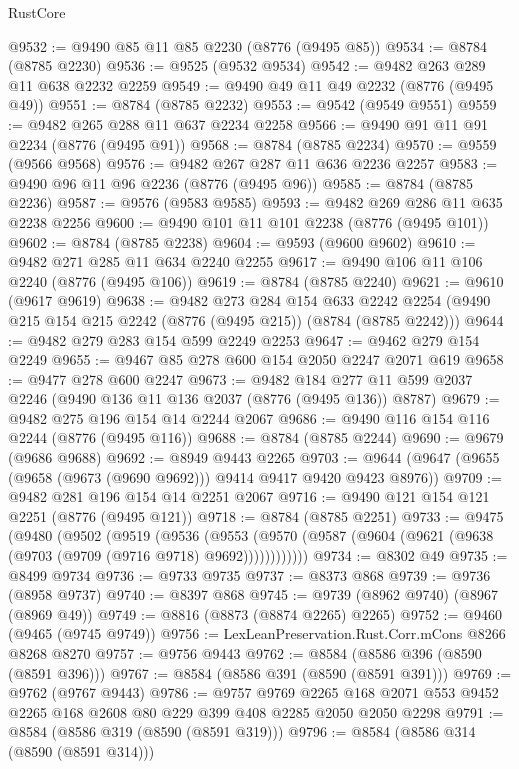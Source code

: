 \begin{lexlean}{RustCore}
\begin{coremodule}
@9532 := @9490 @85 @11 @85 @2230 (@8776 (@9495 @85))
@9534 := @8784 (@8785 @2230)
@9536 := @9525 (@9532 @9534)
@9542 := @9482 @263 @289 @11 @638 @2232 @2259
@9549 := @9490 @49 @11 @49 @2232 (@8776 (@9495 @49))
@9551 := @8784 (@8785 @2232)
@9553 := @9542 (@9549 @9551)
@9559 := @9482 @265 @288 @11 @637 @2234 @2258
@9566 := @9490 @91 @11 @91 @2234 (@8776 (@9495 @91))
@9568 := @8784 (@8785 @2234)
@9570 := @9559 (@9566 @9568)
@9576 := @9482 @267 @287 @11 @636 @2236 @2257
@9583 := @9490 @96 @11 @96 @2236 (@8776 (@9495 @96))
@9585 := @8784 (@8785 @2236)
@9587 := @9576 (@9583 @9585)
@9593 := @9482 @269 @286 @11 @635 @2238 @2256
@9600 := @9490 @101 @11 @101 @2238 (@8776 (@9495 @101))
@9602 := @8784 (@8785 @2238)
@9604 := @9593 (@9600 @9602)
@9610 := @9482 @271 @285 @11 @634 @2240 @2255
@9617 := @9490 @106 @11 @106 @2240 (@8776 (@9495 @106))
@9619 := @8784 (@8785 @2240)
@9621 := @9610 (@9617 @9619)
@9638 := @9482
    @273
    @284
    @154
    @633
    @2242
    @2254
    (@9490 @215 @154 @215 @2242 (@8776 (@9495 @215)) (@8784 (@8785 @2242)))
@9644 := @9482 @279 @283 @154 @599 @2249 @2253
@9647 := @9462 @279 @154 @2249
@9655 := @9467 @85 @278 @600 @154 @2050 @2247 @2071 @619
@9658 := @9477 @278 @600 @2247
@9673 := @9482 @184 @277 @11 @599 @2037 @2246 (@9490 @136 @11 @136 @2037 (@8776 (@9495 @136)) @8787)
@9679 := @9482 @275 @196 @154 @14 @2244 @2067
@9686 := @9490 @116 @154 @116 @2244 (@8776 (@9495 @116))
@9688 := @8784 (@8785 @2244)
@9690 := @9679 (@9686 @9688)
@9692 := @8949 @9443 @2265
@9703 := @9644 (@9647 (@9655 (@9658 (@9673 (@9690 @9692))) @9414 @9417 @9420 @9423 @8976))
@9709 := @9482 @281 @196 @154 @14 @2251 @2067
@9716 := @9490 @121 @154 @121 @2251 (@8776 (@9495 @121))
@9718 := @8784 (@8785 @2251)
@9733 := @9475
    (@9480
      (@9502
        (@9519
          (@9536
            (@9553 (@9570 (@9587 (@9604 (@9621 (@9638 (@9703 (@9709 (@9716 @9718) @9692))))))))))))
@9734 := @8302 @49
@9735 := @8499 @9734
@9736 := @9733 @9735
@9737 := @8373 @868
@9739 := @9736 (@8958 @9737)
@9740 := @8397 @868
@9745 := @9739 (@8962 @9740) (@8967 (@8969 @49))
@9749 := @8816 (@8873 (@8874 @2265) @2265)
@9752 := @9460 (@9465 (@9745 @9749))
@9756 := LexLeanPreservation.Rust.Corr.mCons @8266 @8268 @8270
@9757 := @9756 @9443
@9762 := @8584 (@8586 @396 (@8590 (@8591 @396)))
@9767 := @8584 (@8586 @391 (@8590 (@8591 @391)))
@9769 := @9762 (@9767 @9443)
@9786 := @9757
    @9769
    @2265
    @168
    @2071
    @553
    @9452
    @2265
    @168
    @2608
    @80
    @229
    @399
    @408
    @2285
    @2050
    @2050
    @2298
@9791 := @8584 (@8586 @319 (@8590 (@8591 @319)))
@9796 := @8584 (@8586 @314 (@8590 (@8591 @314)))

\end{coremodule}
\end{lexlean}
